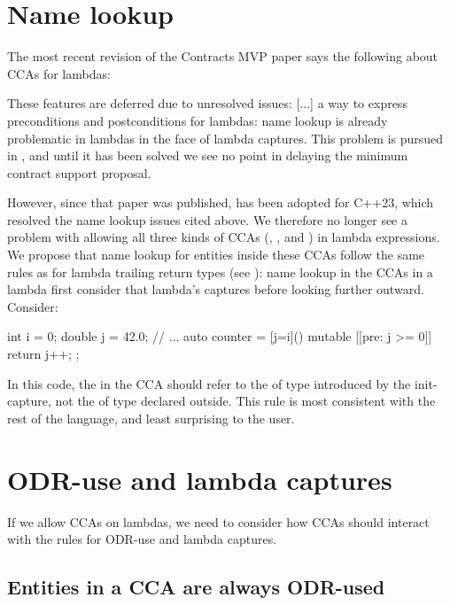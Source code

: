 \section{Name lookup}

The most recent revision of the Contracts MVP paper \cite{P2388R4} says the following about CCAs for lambdas:

\begin{adjustwidth}{0.5cm}{0.5cm}
These features are deferred due to unresolved issues: [...] a way to express preconditions and postconditions for lambdas: name lookup is already problematic in lambdas in the face of lambda captures. This problem is pursued in \cite{P2036R1}, and until it has been solved we see no point in delaying the minimum contract support proposal.
\end{adjustwidth}

\pagebreak

However, since that paper was published, \cite{P2036R3} has been adopted for C++23, which resolved the name lookup issues cited above. We therefore no longer see a problem with allowing all three kinds of CCAs (, , and ) in lambda expressions. We propose that name lookup for entities inside these CCAs follow the same rules as for lambda trailing return types (see \cite{P2036R3}): name lookup in the CCAs in a lambda first consider that lambda’s captures before looking further outward. Consider:

\begin{codeblock}
int i = 0;
double j = 42.0;
// ...
auto counter = [j=i]() mutable [[pre: j >= 0]] {
  return j++;
};
\end{codeblock}

In this code, the  in the CCA should refer to the  of type  introduced by the init-capture, not the  of type  declared outside. This rule is most consistent with the rest of the language, and least surprising to the user.

\section{ODR-use and lambda captures}

If we allow CCAs on lambdas, we need to consider how CCAs should interact with the rules for ODR-use and lambda captures.

\subsection{Entities in a CCA are always ODR-used}

